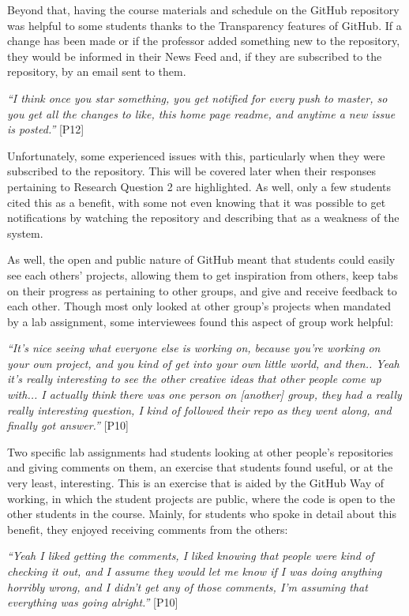 Beyond that, having the course materials and schedule on the GitHub repository was helpful to some students thanks to the Transparency features of GitHub. If a change has been made or if the professor added something new to the repository, they would be informed in their News Feed and, if they are subscribed to the repository, by an email sent to them.

\textit{``I think once you star something, you get notified for every push to master, so you get all the changes to like, this home page readme, and anytime a new issue is posted.''} [P12]

Unfortunately, some experienced issues with this, particularly when they were subscribed to the repository. This will be covered later when their responses pertaining to Research Question 2 are highlighted. As well, only a few students cited this as a benefit, with some not even knowing that it was possible to get notifications by watching the repository and describing that as a weakness of the system.

As well, the open and public nature of GitHub meant that students could easily see each others' projects, allowing them to get inspiration from others, keep tabs on their progress as pertaining to other groups, and give and receive feedback to each other. Though most only looked at other group's projects when mandated by a lab assignment, some interviewees found this aspect of group work helpful:

\textit{``It's nice seeing what everyone else is working on, because you're working on your own project, and you kind of get into your own little world, and then.. Yeah it's really interesting to see the other creative ideas that other people come up with... I actually think there was one person on [another] group, they had a really really interesting question, I kind of followed their repo as they went along, and finally got answer.''} [P10]

Two specific lab assignments had students looking at other people's repositories and giving comments on them, an exercise that students found useful, or at the very least, interesting. This is an exercise that is aided by the GitHub Way of working, in which the student projects are public, where the code is open to the other students in the course. Mainly, for students who spoke in detail about this benefit, they enjoyed receiving comments from the others:

\textit{``Yeah I liked getting the comments, I liked knowing that people were kind of checking it out, and I assume they would let me know if I was doing anything horribly wrong, and I didn't get any of those comments, I'm assuming that everything was going alright.''} [P10]

